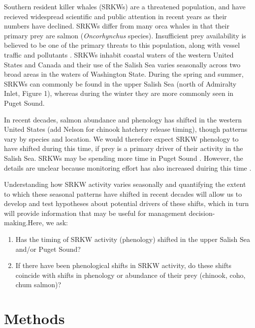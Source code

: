 \documentclass{article}
\begin{document}
\par Southern resident killer whales (SRKWs) are a threatened population, and have recieved widespread scientific and public attention in recent years as their numbers have declined\citep[e.g., seattle times articles,][]{lusseau2009,larson2018, olson2018}. SRKWs differ from many orca whales in that their primary prey are salmon (\emph{Oncorhynchus} species).  Insufficient prey availability is believed to be one of the primary threats to this population, along with vessel traffic and pollutants \citep{krahn2007,lusseau2009,nhanson2010}. SRKWs inhabit coastal waters of the western United States and Canada and their use of the Salish Sea varies seasonally across two broad areas in the waters of Washington State. During the spring and summer, SRKWs can commonly be found in the upper Salish Sea (north of Admiralty Inlet, Figure 1), whereas during the winter they are more commonly seen in  Puget Sound.
\par In recent decades, salmon abundance and phenology has shifted in the western United States \citep{weinheimer2017,reed2011,ford2006,satterthwaite2014}(add Nelson for chinook hatchery release timing), though patterns vary by species and location. We would therefore expect SRKW phenology to have shifted during this time, if prey is a primary driver of their activity in the Salish Sea. SRKWs may be spending more time in Puget Sound \citep{olson2018}. However, the details are unclear because monitoring effort has also increased duiring this time \citep{olson2018, strebel2014}. 
\par Understanding how SRKW activity varies seasonally and quantifying the extent to which these seasonal patterns have shifted in recent decades will allow us to develop and test hypotheses about potential drivers of these shifts, which in turn will provide information that may be useful for management decision-making.Here, we ask:
\begin{enumerate}
\item Has the timing of SRKW activity (phenology) shifted in the upper Salish Sea and/or Puget Sound? 
\item If there have been phenological shifts in SRKW activity, do these shifts coincide with shifts in phenology or abundance of their prey (chinook, coho, chum salmon)?
\end{enumerate}


\section* {Methods}
\end{document}
